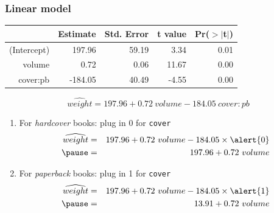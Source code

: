 \documentclass{beamer}
\begin{document}
\begin{frame}
\frametitle{Linear model}

{\small
\begin{center}
\begin{tabular}{rrrrr}
  \hline
 & Estimate & Std. Error & t value & Pr($>$$|$t$|$) \\ 
  \hline
(Intercept) & 197.96 & 59.19 & 3.34 & 0.01 \\ 
  volume & 0.72 & 0.06 & 11.67 & 0.00 \\ 
  cover:pb & -184.05 & 40.49 & -4.55 & 0.00 \\ 
   \hline
\end{tabular}
\end{center}
}

\pause

\[ \widehat{weight} = 197.96 + 0.72~volume - 184.05~cover:pb  \]

\pause

\begin{enumerate}

\item For \textit{hardcover} books: plug in {0} for \tt{cover}
\begin{eqnarray*}
\widehat{weight} &=& 197.96 + 0.72~volume - 184.05 \times \alert{0} \\
\pause
&=& 197.96 +  0.72~volume
\end{eqnarray*}

\pause

\item For \textit{paperback} books: plug in {1} for \texttt{cover}
\begin{eqnarray*}
\widehat{weight} &=& 197.96 + 0.72~volume - 184.05 \times \alert{1} \\
\pause
&=& 13.91 +  0.72~volume
\end{eqnarray*}

\end{enumerate}

\end{frame}

\end{document}
